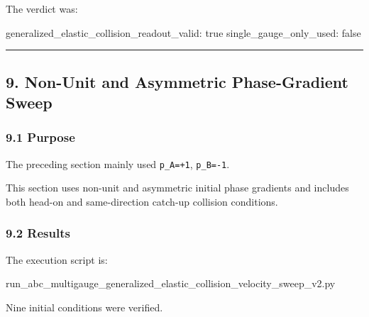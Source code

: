 \documentclass[
  a4paper,
]{article}
\newenvironment{Shaded}{}{}
\newcommand{\NormalTok}[1]{#1}
\begin{document}
The verdict was:

\begin{Shaded}
\begin{Highlighting}[]
\NormalTok{generalized\_elastic\_collision\_readout\_valid: true}
\NormalTok{single\_gauge\_only\_used: false}
\end{Highlighting}
\end{Shaded}

\begin{center}\rule{0.5\linewidth}{0.5pt}\end{center}

\subsection{9. Non-Unit and Asymmetric Phase-Gradient
Sweep}\label{non-unit-and-asymmetric-phase-gradient-sweep}

\subsubsection{9.1 Purpose}\label{purpose}

The preceding section mainly used \texttt{p\_A=+1}, \texttt{p\_B=-1}.

This section uses non-unit and asymmetric initial phase gradients and
includes both head-on and same-direction catch-up collision conditions.

\subsubsection{9.2 Results}\label{results-1}

The execution script is:

\begin{Shaded}
\begin{Highlighting}[]
\NormalTok{run\_abc\_multigauge\_generalized\_elastic\_collision\_velocity\_sweep\_v2.py}
\end{Highlighting}
\end{Shaded}

Nine initial conditions were verified.
\end{document}
